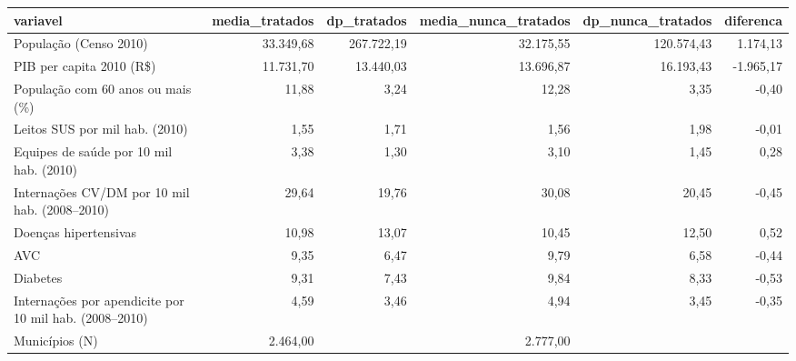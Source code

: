 \begin{tabular}{lrrrrr}
\toprule
variavel & media\_tratados & dp\_tratados & media\_nunca\_tratados & dp\_nunca\_tratados & diferenca \\
\midrule
População (Censo 2010) & 33.349,68 & 267.722,19 & 32.175,55 & 120.574,43 & 1.174,13 \\
PIB per capita 2010 (R\$) & 11.731,70 & 13.440,03 & 13.696,87 & 16.193,43 & -1.965,17 \\
População com 60 anos ou mais (\%) & 11,88 & 3,24 & 12,28 & 3,35 & -0,40 \\
Leitos SUS por mil hab. (2010) & 1,55 & 1,71 & 1,56 & 1,98 & -0,01 \\
Equipes de saúde por 10 mil hab. (2010) & 3,38 & 1,30 & 3,10 & 1,45 & 0,28 \\
Internações CV/DM por 10 mil hab. (2008–2010) & 29,64 & 19,76 & 30,08 & 20,45 & -0,45 \\
  Doenças hipertensivas & 10,98 & 13,07 & 10,45 & 12,50 & 0,52 \\
  AVC & 9,35 & 6,47 & 9,79 & 6,58 & -0,44 \\
  Diabetes & 9,31 & 7,43 & 9,84 & 8,33 & -0,53 \\
Internações por apendicite por 10 mil hab. (2008–2010) & 4,59 & 3,46 & 4,94 & 3,45 & -0,35 \\
Municípios (N) & 2.464,00 &  & 2.777,00 &  &  \\
\bottomrule
\end{tabular}
